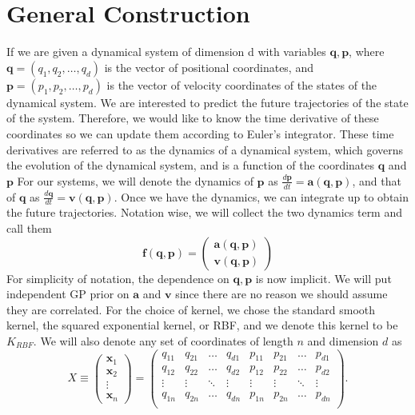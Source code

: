 \documentclass{statsmsc}
\begin{document}
\section{General Construction}
If we are given a dynamical system of dimension d with variables $\mathbf{q}, \mathbf{p}$, where $\mathbf{q} = (q_1, q_2,\dots,q_d)$ is the vector of positional coordinates, and $\mathbf{p}=(p_1, p_2, \dots, p_d)$ is the vector of velocity coordinates of the states of the dynamical system.
We are interested to predict the future trajectories of the state of the system.
Therefore, we would like to know the time derivative of these coordinates so we can update them according to Euler's integrator. 
These time derivatives are referred to as the dynamics of a dynamical system, which governs the evolution of the dynamical system, and is a function of the coordinates $\mathbf{q}$ and $\mathbf{p}$ 
For our systems, we will denote the dynamics of $\mathbf{p}$ as $\frac{d\mathbf{p}}{dt}=\mathbf{a}(\mathbf{q}, \mathbf{p})$, and that of $\mathbf{q}$ as $\frac{d\mathbf{q}}{dt}=\mathbf{v}(\mathbf{q}, \mathbf{p})$.
Once we have the dynamics, we can integrate up to obtain the future trajectories. 
Notation wise, we will collect the two dynamics term and call them $$\mathbf{f(\mathbf{q}, \mathbf{p})}=\begin{pmatrix}
    \mathbf{a(\mathbf{q}, \mathbf{p})}\\\mathbf{v(\mathbf{q}, \mathbf{p})}
\end{pmatrix}$$
For simplicity of notation, the dependence on $\mathbf{q}, \mathbf{p}$ is now implicit. 
We will put independent GP prior on $\mathbf{a}$ and $\mathbf{v}$ since there are no reason we should assume they are correlated. 
For the choice of kernel, we chose the standard smooth kernel, the squared exponential kernel, or RBF, and we denote this kernel to be $K_{RBF}$. 
We will also denote any set of coordinates of length $n$ and dimension $d$ as $$X\equiv\begin{pmatrix}
    \mathbf{x}_1\\\mathbf{x}_2\\\vdots\\\mathbf{x}_n
\end{pmatrix}=\begin{pmatrix}
    q_{11}& q_{21} &\dots& q_{d1} & p_{11} & p_{21} & \dots & p_{d1} \\
    q_{12}& q_{22} &\dots& q_{d2} & p_{12} & p_{22} & \dots & p_{d2} \\
    \vdots &\vdots &\ddots &\vdots &\vdots &\vdots &\ddots &\vdots \\
    q_{1n}& q_{2n} &\dots& q_{dn} & p_{1n} & p_{2n} & \dots & p_{dn} \\
\end{pmatrix}.$$
\end{document}
